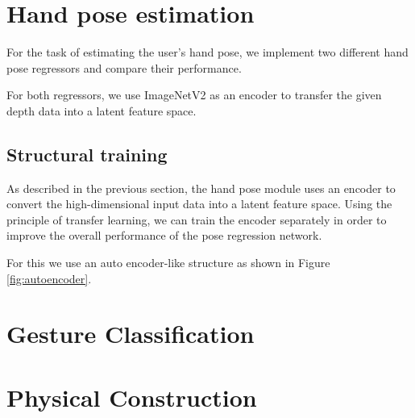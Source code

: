 \section{Hand pose estimation}
For the task of estimating the user's hand pose, we implement two different hand pose regressors and compare their performance. 

For both regressors, we use ImageNetV2 \cite{Sandler} as an encoder to transfer the given depth data into a latent feature space. 

\subsection{Structural training}
As described in the previous section, the hand pose module uses an encoder to convert the high-dimensional input data into a latent feature space. 
Using the principle of transfer learning, we can train the encoder separately in order to improve the overall performance of the pose regression network. 

For this we use an auto encoder-like structure as shown in Figure \ref{fig:autoencoder}.


\section{Gesture Classification}
\section{Physical Construction}
